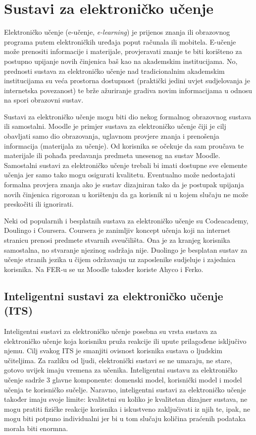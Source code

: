 \documentclass[times, utf8, zavrsni, numeric]{fer}
\begin{document}
\chapter{Sustavi za elektroničko učenje}
Elektroničko učenje (e-učenje, \textit{e-learning}) je prijenos znanja ili obrazovnog programa putem elektroničkih uređaja poput računala ili mobitela. E-učenje može prenositi informacije i materijale, provjeravati znanje te biti korišteno za postupno upijanje novih činjenica baš kao na akademskim institucijama.\cite{derekstock} No, prednosti sustava za elektroničko učenje nad tradicionalnim akademskim institucijama su veća prostorna dostupnost (praktički jedini uvjet sudjelovanja je internetska povezanost) te brže ažuriranje gradiva novim informacijama u odnosu na spori obrazovni sustav.
\cite{eLearningNC}
\par
Sustavi za elektroničko učenje mogu biti dio nekog formalnog obrazovnog sustava ili samostalni. Moodle je primjer sustava za elektroničko učenje čiji je cilj obavljati samo dio obrazovanja, uglavnom provjere znanja i prenošenja informacija (materijala za učenje). Od korisnika se očekuje da sam proučava te materijale ili pohađa predavanja predmeta unesenog na sustav Moodle.\cite{moodle} Samostalni sustavi za elektroničko učenje trebali bi imati dostupne sve elemente učenja jer samo tako mogu osigurati kvalitetu. Eventualno može nedostajati formalna provjera znanja ako je sustav dizajniran tako da je postupak upijanja novih činjenica rigorozan u korištenju da ga korisnik ni u kojem slučaju ne može preskočiti ili ignorirati. 
\par
Neki od popularnih i besplatnih sustava za elektroničko učenje su Codeacademy, Doulingo i Coursera. Coursera je zanimljiv koncept učenja koji na internet stranicu prenosi predmete stvarnih sveučilišta. Ona je za kranjeg korisnika samostalna, no stvaranje njezinog sadržaja nije.\cite{coursera} Duolingo je besplatan sustav za učenje stranih jezika u čijem održavanju uz zaposlenike sudjeluje i zajednica korisnika.\cite{duolingo} Na FER-u se uz Moodle također koriste Ahyco i Ferko.\cite{ferko}
\pagebreak
\section{Inteligentni sustavi za elektroničko učenje (ITS)}
Inteligentni sustavi za elektroničko učenje posebna su vrsta sustava za elektroničko učenje koja korisniku pruža reakcije ili upute prilagođene isključivo njemu. Cilj svakog ITS je smanjiti ovisnost korisnika sustava o ljudskim učiteljima. Za razliku od ljudi, elektronički sustavi se ne umaraju, ne stare, gotovo uvijek imaju vremena za učenika. Inteligentni sustavu za elektroničko učenje sadrže 3 glavne komponente: domenski model, korisnički model i model učenja te korisničko sučelje.\cite{aect}\cite{markurban} Naravno, inteligentni sustavi za elektroničko učenje također imaju svoje limite: kvalitetni su koliko je kvalitetan dizajner sustava, ne mogu pratiti fizičke reakcije korisnika i iskustveno zaključivati iz njih te, ipak, ne mogu biti potpuno individualni jer bi u tom slučaju količina praćenih podataka morala biti enormna.\cite{grubisic2006}
\end{document}
